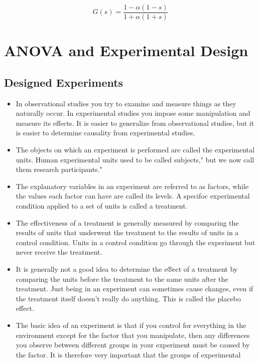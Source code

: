 \[
G(s) = \frac{1-\alpha(1-s)}{1+\alpha(1+s)}
\]












\chapter{ANOVA and Experimental Design }

\section{Designed Experiments}
\begin{itemize}
	\item In observational studies you try to examine and measure things as they naturally occur. In experimental studies you impose some manipulation and measure its effects. It is easier to generalize from
	observational studies, but it is easier to determine causality from experimental studies.
	\item The objects on which an experiment is performed are called the experimental units. Human experimental units used to be called subjects," but we now call them research participants."
	\item The explanatory variables in an experiment are referred to as factors, while the values each factor
	can have are called its levels. A specifoc experimental condition applied to a set of units is called a
	treatment.
	\item The effectiveness of a treatment is generally measured by comparing the results of units that underwent
	the treatment to the results of units in a control condition. Units in a control condition go through the
	experiment but never receive the treatment.
	\item It is generally not a good idea to determine the e®ect of a treatment by comparing the units before
	the treatment to the same units after the treatment. Just being in an experiment can sometimes cause
	changes, even if the treatment itself doesn't really do anything. This is called the placebo effect.
	\item The basic idea of an experiment is that if you control for everything in the environment except for
	the factor that you manipulate, then any differences you observe between different groups in your
	experiment must be caused by the factor. It is therefore very important that the groups of experimental

\end{itemize}
